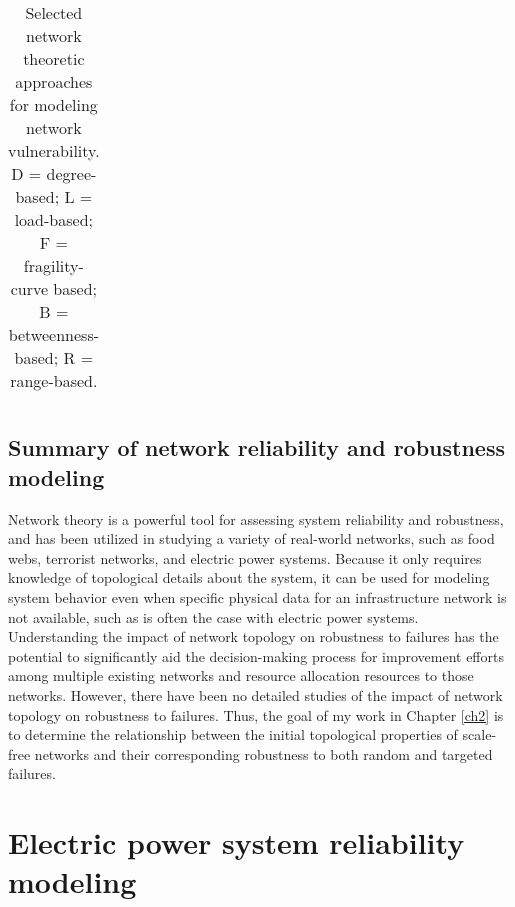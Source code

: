 \begin{landscape}
\begin{table}[h!]
{\begin{tabular}{lllllll}
\bottomrule

\end{tabular}

}

\caption[Selected network theoretic approaches for modeling network vulnerability.]{\label{tab:ch1:networkslit}Selected network theoretic approaches for modeling network vulnerability. D = degree-based; L = load-based; F = fragility-curve based; B = betweenness-based; R = range-based.}
\end{table}
\end{landscape}




\subsection{Summary of network reliability and robustness modeling}
\label{sec:ch1:networkreliability:summary}

Network theory is a powerful tool for assessing system reliability and robustness, and has been utilized in studying a variety of real-world networks, such as food webs, terrorist networks, and electric power systems.  Because it only requires knowledge of topological details about the system, it can be used for modeling system behavior even when specific physical data for an infrastructure network is not available, such as is often the case with electric power systems. Understanding the impact of network topology on robustness to failures has the potential to significantly aid the decision-making process for improvement efforts among multiple existing networks and resource allocation resources to those networks.  However, there have been no detailed studies of the impact of network topology on robustness to failures.  Thus, the goal of my work in Chapter \ref{ch2} is to determine the relationship between the initial topological properties of scale-free networks and their corresponding robustness to both random and targeted failures.


\section{Electric power system reliability modeling}
\label{sec:ch1:powerreliability}

